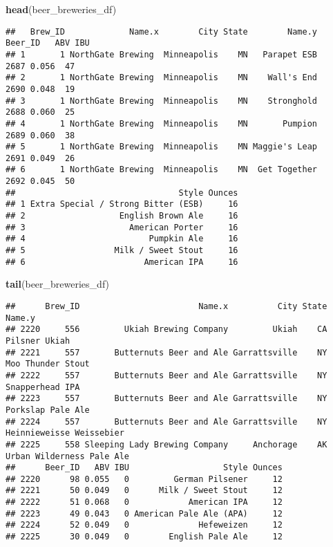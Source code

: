 \documentclass[
]{article}
\newenvironment{Shaded}{\begin{snugshade}}{\end{snugshade}}
\newcommand{\KeywordTok}[1]{\textcolor[rgb]{0.13,0.29,0.53}{\textbf{#1}}}
\newcommand{\NormalTok}[1]{#1}
\begin{document}
\begin{Shaded}
\begin{Highlighting}[]
\KeywordTok{head}\NormalTok{(beer_breweries_df)}
\end{Highlighting}
\end{Shaded}

\begin{verbatim}
##   Brew_ID             Name.x        City State        Name.y Beer_ID   ABV IBU
## 1       1 NorthGate Brewing  Minneapolis    MN   Parapet ESB    2687 0.056  47
## 2       1 NorthGate Brewing  Minneapolis    MN    Wall's End    2690 0.048  19
## 3       1 NorthGate Brewing  Minneapolis    MN    Stronghold    2688 0.060  25
## 4       1 NorthGate Brewing  Minneapolis    MN       Pumpion    2689 0.060  38
## 5       1 NorthGate Brewing  Minneapolis    MN Maggie's Leap    2691 0.049  26
## 6       1 NorthGate Brewing  Minneapolis    MN  Get Together    2692 0.045  50
##                                 Style Ounces
## 1 Extra Special / Strong Bitter (ESB)     16
## 2                   English Brown Ale     16
## 3                     American Porter     16
## 4                         Pumpkin Ale     16
## 5                  Milk / Sweet Stout     16
## 6                        American IPA     16
\end{verbatim}

\begin{Shaded}
\begin{Highlighting}[]
\KeywordTok{tail}\NormalTok{(beer_breweries_df)}
\end{Highlighting}
\end{Shaded}

\begin{verbatim}
##      Brew_ID                        Name.x          City State                    Name.y
## 2220     556         Ukiah Brewing Company         Ukiah    CA             Pilsner Ukiah
## 2221     557       Butternuts Beer and Ale Garrattsville    NY         Moo Thunder Stout
## 2222     557       Butternuts Beer and Ale Garrattsville    NY           Snapperhead IPA
## 2223     557       Butternuts Beer and Ale Garrattsville    NY         Porkslap Pale Ale
## 2224     557       Butternuts Beer and Ale Garrattsville    NY  Heinnieweisse Weissebier
## 2225     558 Sleeping Lady Brewing Company     Anchorage    AK Urban Wilderness Pale Ale
##      Beer_ID   ABV IBU                   Style Ounces
## 2220      98 0.055   0         German Pilsener     12
## 2221      50 0.049   0      Milk / Sweet Stout     12
## 2222      51 0.068   0            American IPA     12
## 2223      49 0.043   0 American Pale Ale (APA)     12
## 2224      52 0.049   0              Hefeweizen     12
## 2225      30 0.049   0        English Pale Ale     12
\end{verbatim}
\end{document}
